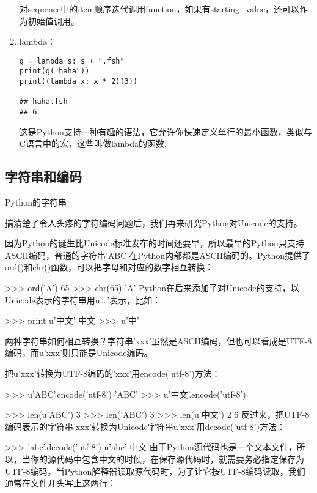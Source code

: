\begin{enumerate}
对sequence中的item顺序迭代调用function，如果有starting\_value，还可以作为初始值调用。


\item lambda：
    \newpage
\begin{verbatim}
g = lambda s: s + ".fsh"
print(g("haha"))
print((lambda x: x * 2)(3))

## haha.fsh
## 6
\end{verbatim}

这是Python支持一种有趣的语法，它允许你快速定义单行的最小函数，类似与C语言中的宏，这些叫做lambda的函数.
\end{enumerate}


\subsection{字符串和编码}

Python的字符串

搞清楚了令人头疼的字符编码问题后，我们再来研究Python对Unicode的支持。

因为Python的诞生比Unicode标准发布的时间还要早，所以最早的Python只支持ASCII编码，普通的字符串'ABC'在Python内部都是ASCII编码的。Python提供了ord()和chr()函数，可以把字母和对应的数字相互转换：

>>> ord('A')
65
>>> chr(65)
'A'
Python在后来添加了对Unicode的支持，以Unicode表示的字符串用u'...'表示，比如：

>>> print u'中文'
中文
>>> u'中'

两种字符串如何相互转换？字符串'xxx'虽然是ASCII编码，但也可以看成是UTF-8编码，而u'xxx'则只能是Unicode编码。

把u'xxx'转换为UTF-8编码的'xxx'用encode('utf-8')方法：

>>> u'ABC'.encode('utf-8')
'ABC'
>>> u'中文'.encode('utf-8')

>>> len(u'ABC')
3
>>> len('ABC')
3
>>> len(u'中文')
2
6
反过来，把UTF-8编码表示的字符串'xxx'转换为Unicode字符串u'xxx'用decode('utf-8')方法：

>>> 'abc'.decode('utf-8')
u'abc'
中文
由于Python源代码也是一个文本文件，所以，当你的源代码中包含中文的时候，在保存源代码时，就需要务必指定保存为UTF-8编码。当Python解释器读取源代码时，为了让它按UTF-8编码读取，我们通常在文件开头写上这两行：

